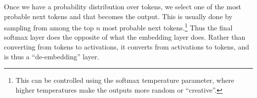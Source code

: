 Once we have a probability distribution over tokens, we select one of the most probable next tokens and that becomes the output. This is usually done by sampling from among the top $n$ most probable next tokens.\footnote{This can be controlled using the softmax temperature parameter, where higher temperatures make the outputs more random or ``creative''.} Thus the final softmax layer does the opposite of what the embedding layer does. Rather than converting from tokens to activations, it converts from activations to tokens, and is thus a ``de-embedding'' layer.

%
%
